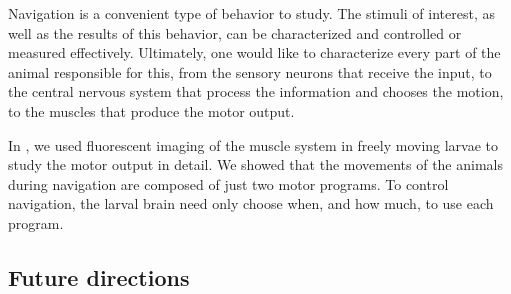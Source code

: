 \documentclass[12pt]{article}
\begin{document}
Navigation is a convenient type of behavior to study. The stimuli of interest, as well as the results of this behavior, can be characterized and controlled or measured effectively. Ultimately, one would like to characterize every part of the animal responsible for this, from the sensory neurons that receive the input, to the central nervous system that process the information and chooses the motion, to the muscles that produce the motor output.

In \cite{Lahiri2011}, we used fluorescent imaging of the muscle system in freely moving larvae to study the motor output in detail. We showed that the movements of the animals during navigation are composed of just two motor programs. To control navigation, the larval brain need only choose when, and how much, to use each program.

\subsection*{Future directions}












\end{document}

